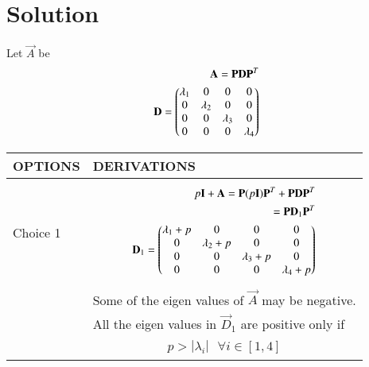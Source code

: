\documentclass[journal,12pt,twocolumn]{IEEEtran}
\begin{document}
\section{Solution}
Let $\vec{A}$ be
\begin{align}
    \mathbf{A}=\mathbf{P}\mathbf{D}\mathbf{P}^T\\
    \mathbf{D}=\begin{pmatrix}\lambda_1&0&0&0\\0&\lambda_2&0&0\\0&0&\lambda_3&0\\0&0&0&\lambda_4\end{pmatrix}
\end{align}


\begin{table*}[!t]
    \centering
    \begin{tabular}{|l|l|}
    \hline

    \textbf{OPTIONS} & \textbf{DERIVATIONS}\\
    \hline
     Choice 1 & 
      \parbox{12cm}{\begin{align}
         p\mathbf{I}+\mathbf{A}=\mathbf{P}(p\mathbf{I})\mathbf{P}^T+\mathbf{P}\mathbf{D}\mathbf{P}^T\\
   = \mathbf{P}\mathbf{D}_1\mathbf{P}^T\\
    \mathbf{D}_1=\begin{pmatrix}\lambda_1+p&0&0&0\\0&\lambda_2+p&0&0\\0&0&\lambda_3+p&0\\0&0&0&\lambda_4+p\end{pmatrix}
    \end{align}}\\
     & Some of the eigen values of $\vec{A}$ may be negative.\\
     & All the eigen values in $\vec{D}_1$ are positive only if \\
     & \parbox{12cm}{\begin{align}
          p>|\lambda_i|\text{  } \forall i \in [1,4]
     \end{align}}\\
      

\end{tabular}
\end{table*}
\end{document}
